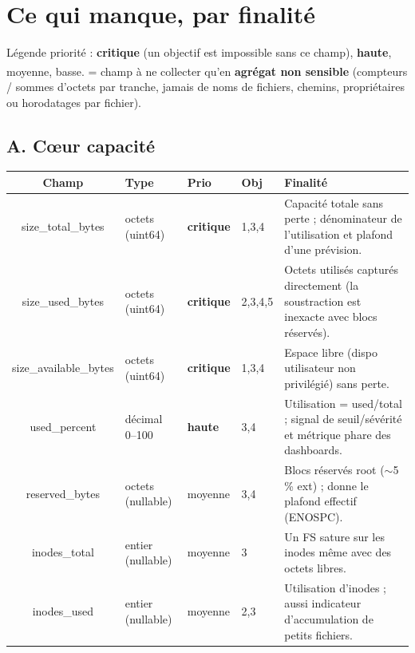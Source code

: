\documentclass[11pt,a4paper]{article}
\newcommand{\pCrit}{\textcolor{cBlock}{\textbf{critique}}}
\newcommand{\pHigh}{\textcolor{cHigh}{\textbf{haute}}}
\newcommand{\pMed}{\textcolor{cMed}{moyenne}}
\newcommand{\pLow}{\textcolor{cLow}{basse}}
\newcommand{\priv}{\textsuperscript{\textcolor{cBlock}{\dag}}}
\begin{document}
\section{Ce qui manque, par finalit\'e}

L\'egende priorit\'e : \pCrit{} (un objectif est impossible sans ce champ),
\pHigh{}, \pMed{}, \pLow{}. \quad
\priv{} = champ \`a ne collecter qu'en \textbf{agr\'egat non sensible} (compteurs / sommes
d'octets par tranche, jamais de noms de fichiers, chemins, propri\'etaires ou horodatages par fichier).

\subsection{A. C\oe ur capacit\'e}

\begin{center}
\begin{longtable}{C T O O F}
\toprule
\textbf{\normalfont Champ} & \textbf{\normalfont Type} & \textbf{\normalfont Prio} & \textbf{\normalfont Obj} & \textbf{\normalfont Finalit\'e} \\
\midrule
\endhead
size\_total\_bytes & octets (uint64) & \pCrit & 1,3,4 & Capacit\'e totale sans perte ; d\'enominateur de l'utilisation et plafond d'une pr\'evision. \\
size\_used\_bytes & octets (uint64) & \pCrit & 2,3,4,5 & Octets utilis\'es captur\'es directement (la soustraction est inexacte avec blocs r\'eserv\'es). \\
size\_available\_bytes & octets (uint64) & \pCrit & 1,3,4 & Espace libre (dispo utilisateur non privil\'egi\'e) sans perte. \\
used\_percent & d\'ecimal 0--100 & \pHigh & 3,4 & Utilisation = used/total ; signal de seuil/s\'ev\'erit\'e et m\'etrique phare des dashboards. \\
reserved\_bytes & octets (nullable) & \pMed & 3,4 & Blocs r\'eserv\'es root ($\sim$5\,\% ext) ; donne le plafond effectif (ENOSPC). \\
inodes\_total & entier (nullable) & \pMed & 3 & Un FS sature sur les inodes m\^eme avec des octets libres. \\
inodes\_used & entier (nullable) & \pMed & 2,3 & Utilisation d'inodes ; aussi indicateur d'accumulation de petits fichiers. \\
\bottomrule
\end{longtable}
\end{center}
\end{document}
